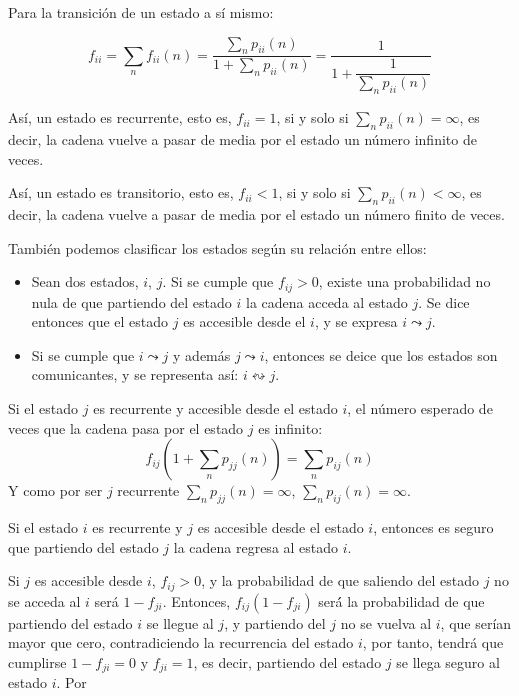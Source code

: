 Para la transici\'on de un estado a s\'i mismo:

\begin{equation*}
f_{ii}=\sum_nf_{ii}(n)=\dfrac{\sum_np_{ii}(n)}{1+\sum_np_{ii}(n)}=\dfrac{1}{1+\dfrac{1}{\sum_np_{ii}(n)}}
\end{equation*}


As\'i, un estado es recurrente, esto es, $f_{ii}=1$, si y solo si $\sum_np_{ii}(n)=\infty$, es decir, la cadena vuelve a pasar de media por el estado un n\'umero infinito de veces.

As\'i, un estado es transitorio, esto es, $f_{ii}<1$, si y solo si $\sum_np_{ii}(n)<\infty$, es decir, la cadena vuelve a pasar de media por el estado un n\'umero finito de veces.


Tambi\'en podemos clasificar los estados seg\'un su relaci\'on entre ellos:
\begin{itemize}
\item Sean dos estados, $i$, $j$. Si se cumple que $f_{ij}>0$, existe una probabilidad no nula de que partiendo del estado $i$ la cadena acceda al estado $j$. Se dice entonces que el estado $j$ es accesible desde el $i$, y se expresa $i\leadsto j$.
\item Si se cumple que $i\leadsto j$ y adem\'as $j\leadsto i$, entonces se deice que los estados son comunicantes, y se representa as\'i: $i\leftrightsquigarrow j$.
\end{itemize}

Si el estado $j$ es recurrente y accesible desde el estado $i$, el n\'umero esperado de veces que la cadena pasa por el estado $j$ es infinito:
\begin{equation*}
f_{ij}\left(1+\sum_np_{jj}(n)\right)=\sum_np_{ij}(n)
\end{equation*}
Y como por ser $j$ recurrente $\sum_np_{jj}(n)=\infty$, $\sum_np_{ij}(n)=\infty$.

Si el estado $i$ es recurrente y $j$ es accesible desde el estado $i$, entonces es seguro que partiendo del estado $j$ la cadena regresa al estado $i$.

Si $j$ es accesible desde $i$, $f_{ij}>0$, y la probabilidad de que saliendo del estado $j$ no se acceda al $i$ ser\'a $1-f_{ji}$. Entonces, $f_{ij}(1-f_{ji})$ ser\'á la probabilidad de que partiendo del estado $i$ se llegue al $j$, y partiendo del $j$ no se vuelva al $i$, que ser\'ian mayor que cero, contradiciendo la recurrencia del estado $i$, por tanto, tendr\'a que cumplirse $1-f_{ji}=0$ y $f_{ji}=1$, es decir, partiendo del estado $j$ se llega seguro al estado $i$. Por
